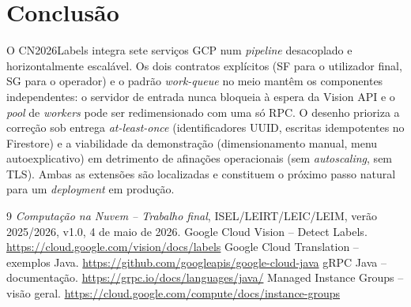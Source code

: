 \documentclass[11pt,a4paper]{article}
\begin{document}
\section{Conclus\~ao}
\label{sec:conclusao}

O CN2026Labels integra sete servi\c{c}os GCP num \emph{pipeline}
desacoplado e horizontalmente escal\'avel. Os dois contratos expl\'icitos
(SF para o utilizador final, SG para o operador) e o padr\~ao
\emph{work-queue} no meio mant\^em os componentes independentes: o
servidor de entrada nunca bloqueia \`a espera da Vision API e o
\emph{pool} de \emph{workers} pode ser redimensionado com uma s\'o RPC.
O desenho prioriza a corre\c{c}\~ao sob entrega \emph{at-least-once}
(identificadores UUID, escritas idempotentes no Firestore) e a
viabilidade da demonstra\c{c}\~ao (dimensionamento manual, menu
autoexplicativo) em detrimento de afina\c{c}\~oes operacionais (sem
\emph{autoscaling}, sem TLS). Ambas as extens\~oes s\~ao localizadas e
constituem o pr\'oximo passo natural para um \emph{deployment} em
produ\c{c}\~ao.

\begin{thebibliography}{9}
 \emph{Computa\c{c}\~ao na Nuvem -- Trabalho final},
ISEL/LEIRT/LEIC/LEIM, ver\~ao 2025/2026, v1.0, 4 de maio de 2026.
 Google Cloud Vision -- Detect Labels.
\url{https://cloud.google.com/vision/docs/labels}
 Google Cloud Translation -- exemplos Java.
\url{https://github.com/googleapis/google-cloud-java}
 gRPC Java -- documenta\c{c}\~ao.
\url{https://grpc.io/docs/languages/java/}
 Managed Instance Groups -- vis\~ao geral.
\url{https://cloud.google.com/compute/docs/instance-groups}
\end{thebibliography}
\end{document}
